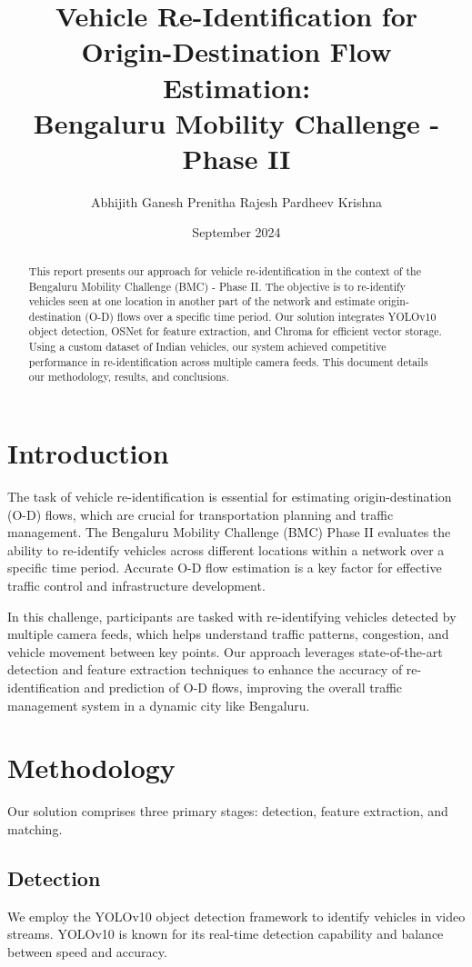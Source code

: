 \documentclass[11pt]{IEEEtran}
\title{\textbf{\Large Vehicle Re-Identification for Origin-Destination Flow
        Estimation:} \\
    \large Bengaluru Mobility Challenge - Phase II}
\author{
    Abhijith Ganesh
    Prenitha Rajesh
    Pardheev Krishna
}
\date{September 2024}
\begin{document}
\maketitle
\begin{abstract}
    This report presents our approach for vehicle re-identification in the
    context of the Bengaluru Mobility Challenge (BMC) - Phase II. The objective
    is to re-identify vehicles seen at one location in another part of the
    network
    and estimate origin-destination (O-D) flows over a specific time period.
    Our
    solution integrates YOLOv10 object detection, OSNet for feature extraction,
    and
    Chroma for efficient vector storage. Using a custom dataset of Indian
    vehicles,
    our system achieved competitive performance in re-identification across
    multiple
    camera feeds. This document details our methodology, results, and
    conclusions.
\end{abstract}

\section{Introduction}
The task of vehicle re-identification is essential for estimating
origin-destination (O-D) flows, which are crucial for transportation planning
and traffic management. The Bengaluru Mobility Challenge (BMC) Phase II
evaluates the ability to re-identify vehicles across different locations within
a network over a specific time period. Accurate O-D flow estimation is a key
factor for effective traffic control and infrastructure development.

In this challenge, participants are tasked with re-identifying vehicles
detected by multiple camera feeds, which helps understand traffic patterns,
congestion, and vehicle movement between key points. Our approach leverages
state-of-the-art detection and feature extraction techniques to enhance the
accuracy of re-identification and prediction of O-D flows, improving the
overall traffic management system in a dynamic city like Bengaluru.

\section{Methodology}
Our solution comprises three primary stages: detection, feature extraction, and
matching.

\subsection{Detection}
We employ the YOLOv10 object detection framework \cite{wang2024yolov10} to
identify vehicles in video streams. YOLOv10 is known for its real-time
detection capability and balance between speed and accuracy.
\end{document}
